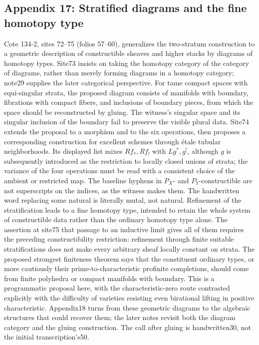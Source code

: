 \subsection*{Appendix 17: Stratified diagrams and the fine homotopy type}
Cote 134-2, sites 72--75 (folios 57--60), generalizes the two-stratum construction to a geometric description of constructible sheaves and higher stacks by diagrams of homotopy types. Site73 insists on taking the homotopy category of the category of diagrams, rather than merely forming diagrams in a homotopy category; note29 supplies the later categorical perspective. For tame compact spaces with equi-singular strata, the proposed diagram consists of manifolds with boundary, fibrations with compact fibers, and inclusions of boundary pieces, from which the space should be reconstructed by gluing. The witness's singular space and its singular inclusion of the boundary fail to preserve the visible plural data. Site74 extends the proposal to a morphism and to the six operations, then proposes a corresponding construction for excellent schemes through étale tubular neighborhoods. Its displayed list mixes $Rf_*,Rf_!$ with $Lg^*,g^!$, although $g$ is subsequently introduced as the restriction to locally closed unions of strata; the variance of the four operations must be read with a consistent choice of the ambient or restricted map. The baseline hyphens in $P_X$- and $P_Y$-constructible are not superscripts on the indices, as the witness makes them. The handwritten word replacing some natural is literally mutal, not natural. Refinement of the stratification leads to a fine homotopy type, intended to retain the whole system of constructible data rather than the ordinary homotopy type alone. The assertion at site75 that passage to an inductive limit gives all of them requires the preceding constructibility restriction: refinement through finite suitable stratifications does not make every arbitrary sheaf locally constant on strata. The proposed strongest finiteness theorem says that the constituent ordinary types, or more cautiously their prime-to-characteristic profinite completions, should come from finite polyhedra or compact manifolds with boundary. This is a programmatic proposal here, with the characteristic-zero route contrasted explicitly with the difficulty of varieties resisting even birational lifting in positive characteristic. Appendix18 turns from these geometric diagrams to the algebraic structures that could recover them; the later notes revisit both the diagram category and the gluing construction. The call after gluing is handwritten30, not the initial transcription's50.

